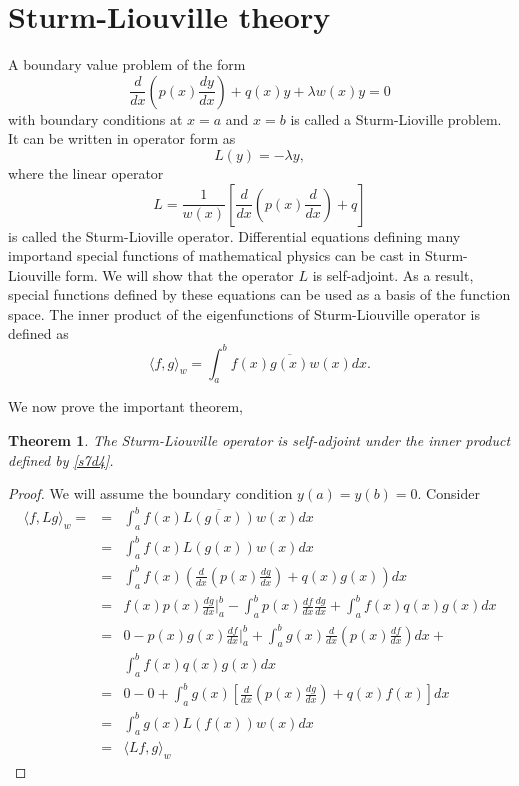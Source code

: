 \documentclass{article}
\theoremstyle{plain}
\newtheorem{thm}{Theorem}
\numberwithin{thm}{section}
\theoremstyle{plain}
\numberwithin{prop}{section}
\theoremstyle{definition}
\numberwithin{defn}{section}
\theoremstyle{remark}
\numberwithin{equation}{section}
\begin{document}
\section{Sturm-Liouville theory}\label{s7}
A boundary value problem of the form
\begin{equation}\label{s7d1}
\frac{d}{dx}\left(p(x)\frac{dy}{dx}\right) + q(x)y + \lambda w(x)y = 0
\end{equation}
with boundary conditions at $x=a$ and $x=b$ is called a Sturm-Lioville problem.
It can be written in operator form as
\begin{equation}\label{s7d2}
L(y) = -\lambda y,
\end{equation}
where the linear operator
\begin{equation}\label{s7d3}
L = \frac{1}{w(x)}\left[\frac{d}{dx}\left(p(x)\frac{d}{dx}\right) + q\right]
\end{equation}
is called the Sturm-Lioville operator. Differential equations defining many
importand special functions of mathematical physics can be cast in Sturm-
Liouville form. We will show that the operator $L$ is self-adjoint. As a result,
special functions defined by these equations can be used as a basis of the
function space. The inner product of the eigenfunctions of Sturm-Liouville 
operator is defined as 
\begin{equation}\label{s7d4}
\langle f, g\rangle_w = \int_a^b f(x)\overline{g(x)}w(x)dx.
\end{equation}

We now prove the important theorem,
\begin{thm}\label{s7t1}
The Sturm-Liouville operator is self-adjoint under the inner product defined by
\eqref{s7d4}.
\end{thm}
\begin{proof}
We will assume the boundary condition $y(a) = y(b) = 0$. Consider
\begin{eqnarray*}
\langle f, Lg \rangle_w = &=& \int_a^b f(x)\overline{L(g(x))}w(x) dx \\
 &=& \int_a^b f(x) L(g(x)) w(x)dx \\
 &=& \int_a^b f(x)\left(\frac{d}{dx}\left(p(x)\frac{dg}{dx}\right) + q(x)g(x)
 \right)dx \\
 &=& f(x)p(x)\frac{dg}{dx}\Big|_a^b - \int_a^b p(x)\frac{df}{dx}\frac{dg}{dx}
 + \int_a^b f(x)q(x)g(x)dx \\
 &=& 0 - p(x)g(x)\frac{df}{dx}\Big|_a^b + \int_a^b g(x)\frac{d}{dx}\left(p(x)
 \frac{df}{dx}\right) dx + \\
 & & \int_a^b f(x)q(x)g(x)dx \\
 &=& 0 - 0 + \int_a^b g(x)\left[\frac{d}{dx}\left(p(x)\frac{dg}{dx}\right) + 
 q(x)f(x)\right]dx \\
 &=& \int_a^b g(x)L(f(x))w(x)dx \\
 &=& \langle Lf, g\rangle_w
\end{eqnarray*}
\end{proof}
\end{document}
